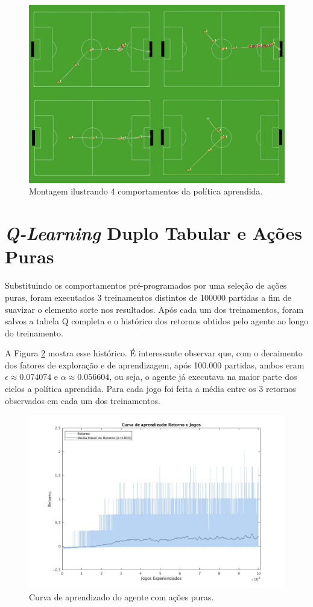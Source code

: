 \begin{figure}[H]
	\includegraphics[width=1\linewidth]{figs/behaviors-result.jpg}
	\centering
	\caption{Montagem ilustrando 4 comportamentos da política aprendida.}
	\label{fig:behaviors-result}
\end{figure}

\section{\textit{Q-Learning} Duplo Tabular e Ações Puras}

Substituindo os comportamentos pré-programados por uma seleção de ações puras, foram executados 3 treinamentos distintos de 100000 partidas a fim de suavizar o elemento sorte nos resultados. Após cada um dos treinamentos, foram salvos a tabela Q completa e o histórico dos retornos obtidos pelo agente ao longo do treinamento.

A Figura \ref{fig:single-agent-curva} mostra esse histórico. É interessante observar que, com o decaimento dos fatores de exploração e de aprendizagem, após 100.000 partidas, ambos eram $\epsilon \approx 0.074074$ e $\alpha \approx 0.056604$, ou seja, o agente já executava na maior parte dos ciclos a política aprendida. Para cada jogo foi feita a média entre os 3 retornos observados em cada um dos treinamentos.

\begin{figure}[H]
	\includegraphics[width=0.93\linewidth]{figs/curva-qtabular.jpg}
	\centering
	\caption{Curva de aprendizado do agente com ações puras. }
	\label{fig:single-agent-curva}
\end{figure}


